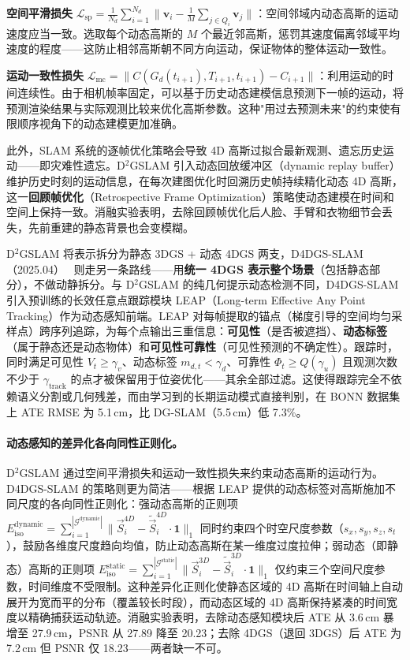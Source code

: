\textbf{空间平滑损失} $\mathcal{L}_\text{sp} = \frac{1}{N_d}\sum_{i=1}^{N_d} \| \boldsymbol{v}_i - \frac{1}{M}\sum_{j \in Q_i} \boldsymbol{v}_j \|$：空间邻域内动态高斯的运动速度应当一致。选取每个动态高斯的 $M$ 个最近邻高斯，惩罚其速度偏离邻域平均速度的程度——这防止相邻高斯朝不同方向运动，保证物体的整体运动一致性。

\textbf{运动一致性损失} $\mathcal{L}_\text{mc} = \|C(G_d(t_{i+1}), T_{i+1}, t_{i+1}) - C_{i+1}\|$：利用运动的时间连续性。由于相机帧率固定，可以基于历史动态建模信息预测下一帧的运动，将预测渲染结果与实际观测比较来优化高斯参数。这种"用过去预测未来"的约束使有限顺序视角下的动态建模更加准确。

此外，SLAM 系统的逐帧优化策略会导致 4D 高斯过拟合最新观测、遗忘历史运动——即灾难性遗忘。D$^2$GSLAM 引入动态回放缓冲区（dynamic replay buffer）维护历史时刻的运动信息，在每次建图优化时回溯历史帧持续精化动态 4D 高斯，这一\textbf{回顾帧优化}（Retrospective Frame Optimization）策略使动态建模在时间和空间上保持一致。消融实验表明，去除回顾帧优化后人脸、手臂和衣物细节会丢失，先前重建的静态背景也会变模糊。

D$^2$GSLAM 将表示拆分为静态 3DGS + 动态 4DGS 两支，D4DGS-SLAM（2025.04）~\cite{2504_04844} 则走另一条路线——用\textbf{统一 4DGS 表示整个场景}（包括静态部分），不做动静拆分。与 D$^2$GSLAM 的纯几何提示动态检测不同，D4DGS-SLAM 引入预训练的长效任意点跟踪模块 LEAP（Long-term Effective Any Point Tracking）作为动态感知前端。LEAP 对每帧提取的锚点（梯度引导的空间均匀采样点）跨序列追踪，为每个点输出三重信息：\textbf{可见性}（是否被遮挡）、\textbf{动态标签}（属于静态还是动态物体）和\textbf{可见性可靠性}（可见性预测的不确定性）。跟踪时，同时满足可见性 $V_t \geq \gamma_v$、动态标签 $m_{d,t} < \gamma_d$、可靠性 $\Phi_t \geq Q(\gamma_u)$ 且观测次数不少于 $\gamma_{\mathrm{track}}$ 的点才被保留用于位姿优化——其余全部过滤。这使得跟踪完全不依赖语义分割或几何残差，而由学习到的长期运动模式直接判别，在 BONN 数据集上 ATE RMSE 为 5.1\,cm，比 DG-SLAM（5.5\,cm）低 7.3\%。

\paragraph{动态感知的差异化各向同性正则化。}
D$^2$GSLAM 通过空间平滑损失和运动一致性损失来约束动态高斯的运动行为。D4DGS-SLAM 的策略则更为简洁——根据 LEAP 提供的动态标签对高斯施加不同尺度的各向同性正则化：强动态高斯的正则项 $E_{\mathrm{iso}}^{\mathrm{dynamic}} = \sum_{i=1}^{|\mathcal{G}^{\mathrm{dynamic}}|} \|\vec{S}_i^{4D} - \tilde{\vec{S}}_i^{4D} \cdot \mathbf{1}\|_1$ 同时约束四个时空尺度参数（$s_x, s_y, s_z, s_t$），鼓励各维度尺度趋向均值，防止动态高斯在某一维度过度拉伸；弱动态（即静态）高斯的正则项 $E_{\mathrm{iso}}^{\mathrm{static}} = \sum_{i=1}^{|\mathcal{G}^{\mathrm{static}}|} \|\vec{S}_i^{3D} - \tilde{\vec{S}}_i^{3D} \cdot \mathbf{1}\|_1$ 仅约束三个空间尺度参数，时间维度不受限制。这种差异化正则化使静态区域的 4D 高斯在时间轴上自动展开为宽而平的分布（覆盖较长时段），而动态区域的 4D 高斯保持紧凑的时间宽度以精确捕获运动轨迹。消融实验表明，去除动态感知模块后 ATE 从 3.6\,cm 暴增至 27.9\,cm，PSNR 从 27.89 降至 20.23；去除 4DGS（退回 3DGS）后 ATE 为 7.2\,cm 但 PSNR 仅 18.23——两者缺一不可。


